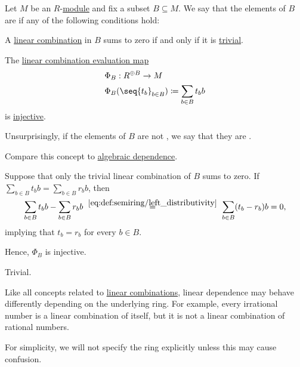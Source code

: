 \begin{definition}\label{def:linear_dependence}\mimprovised
  Let \( M \) be an \( R \)-\hyperref[def:module]{module} and fix a subset \( B \subseteq M \). We say that the elements of \( B \) are  if any of the following conditions hold:

  \begin{thmenum}
     A \hyperref[rem:linear_combinations]{linear combination} in \( B \) sums to zero if and only if it is \hyperref[def:free_semimodule]{trivial}.

     The \hyperref[thm:free_semimodule_universal_property]{linear combination evaluation map}
    \begin{equation*}
      \begin{aligned}
        &\Phi_B: R^{\oplus B} \to M \\
        &\Phi_B( \seq{ t_b }_{b \in B} ) \coloneqq \sum_{b \in B} t_b b
      \end{aligned}
    \end{equation*}
    is \hyperref[def:function_invertibility/injective]{injective}.
  \end{thmenum}

  Unsurprisingly, if the elements of \( B \) are not , we say that they are .

  Compare this concept to \hyperref[def:algebraic_dependence]{algebraic dependence}.
\end{definition}
\begin{defproof}
   Suppose that only the trivial linear combination of \( B \) sums to zero. If \( \sum_{b \in B} t_b b = \sum_{b \in B} r_b b \), then
  \begin{equation*}
    \sum_{b \in B} t_b b - \sum_{b \in B} r_b b
    \reloset {\eqref{eq:def:semiring/left_distributivity}} =
    \sum_{b \in B} (t_b - r_b) b
    =
    0,
  \end{equation*}
  implying that \( t_b = r_b \) for every \( b \in B \).

  Hence, \( \Phi_B \) is injective.

   Trivial.
\end{defproof}

\begin{remark}\label{rem:linear_dependence_base_ring}
  Like all concepts related to \hyperref[rem:linear_combinations]{linear combinations}, linear dependence may behave differently depending on the underlying ring. For example, every irrational number is a linear combination of itself, but it is not a linear combination of rational numbers.

  For simplicity, we will not specify the ring explicitly unless this may cause confusion.
\end{remark}

